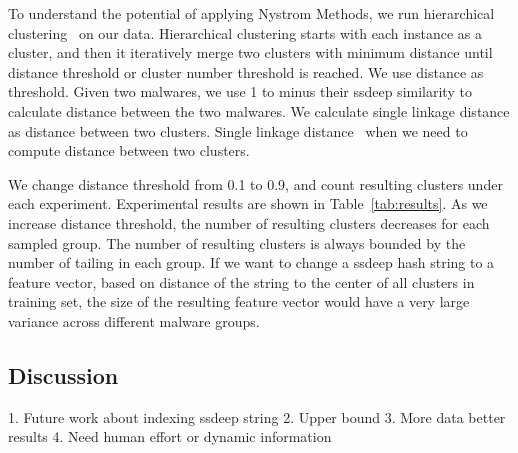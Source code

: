 To understand the potential of applying Nystrom Methods, we run hierarchical clustering~\cite{hcluster} on our data.
Hierarchical clustering starts with each instance as a cluster, 
and then it iteratively merge two clusters with minimum distance 
until distance threshold or cluster number threshold is reached. 
We use distance as threshold. 
Given two malwares, 
we use 1 to minus their ssdeep similarity to calculate distance between the two malwares. 
We calculate single linkage distance as distance between two clusters. 
Single linkage
distance~\cite{single-link} when we need to compute distance between two clusters. 

We change distance threshold from 0.1 to 0.9, 
and count resulting clusters under each experiment. 
Experimental results are shown in Table~\ref{tab:results}. 
As we increase distance threshold, the number of resulting clusters decreases for each sampled group. 
The number of resulting clusters is always bounded by the number of tailing in each group. 
If we want to change a ssdeep hash string to a feature vector, 
based on distance of the string to the center of all clusters in training set, 
the size of the resulting feature vector would have a very large variance across different malware groups. 





\subsection{Discussion}
1. Future work about indexing ssdeep string
2. Upper bound
3. More data better results
4. Need human effort or dynamic information 